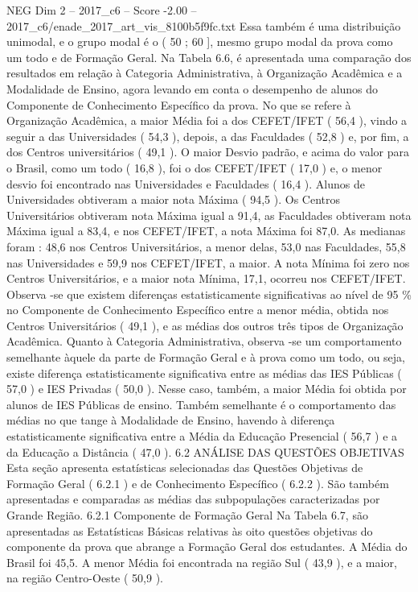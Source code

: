 \begin{textsample}{NEG Dim 2 – 2017\_c6 – Score -2.00 – 2017\_c6/enade\_2017\_art\_vis\_8100b5f9fc.txt}
Essa também é uma distribuição unimodal, e o grupo modal é o ( 50 ; 60 ], mesmo grupo modal da prova como um todo e de Formação Geral.
Na Tabela 6.6, é apresentada uma comparação dos resultados em relação à Categoria Administrativa, à Organização Acadêmica e a Modalidade de Ensino, agora levando em conta o desempenho de alunos do Componente de Conhecimento Específico da prova.
No que se refere à Organização Acadêmica, a maior Média foi a dos CEFET/IFET ( 56,4 ), vindo a seguir a das Universidades ( 54,3 ), depois, a das Faculdades ( 52,8 ) e, por fim, a dos Centros universitários ( 49,1 ).
O maior Desvio padrão, e acima do valor para o Brasil, como um todo ( 16,8 ), foi o dos CEFET/IFET ( 17,0 ) e, o menor desvio foi encontrado nas Universidades e Faculdades ( 16,4 ).
Alunos de Universidades obtiveram a maior nota Máxima ( 94,5 ).
Os Centros Universitários obtiveram nota Máxima igual a 91,4, as Faculdades obtiveram nota Máxima igual a 83,4, e nos CEFET/IFET, a nota Máxima foi 87,0.
As medianas foram : 48,6 nos Centros Universitários, a menor delas, 53,0 nas Faculdades, 55,8 nas Universidades e 59,9 nos CEFET/IFET, a maior.
A nota Mínima foi zero nos Centros Universitários, e a maior nota Mínima, 17,1, ocorreu nos CEFET/IFET.
Observa -se que existem diferenças estatisticamente significativas ao nível de 95 \% no Componente de Conhecimento Específico entre a menor média, obtida nos Centros Universitários ( 49,1 ), e as médias dos outros três tipos de Organização Acadêmica.
Quanto à Categoria Administrativa, observa -se um comportamento semelhante àquele da parte de Formação Geral e à prova como um todo, ou seja, existe diferença estatisticamente significativa entre as médias das IES Públicas ( 57,0 ) e IES Privadas ( 50,0 ).
Nesse caso, também, a maior Média foi obtida por alunos de IES Públicas de ensino.
Também semelhante é o comportamento das médias no que tange à Modalidade de Ensino, havendo à diferença estatisticamente significativa entre a Média da Educação Presencial ( 56,7 ) e a da Educação a Distância ( 47,0 ). 6.2 ANÁLISE DAS QUESTÕES OBJETIVAS Esta seção apresenta estatísticas selecionadas das Questões Objetivas de Formação Geral ( 6.2.1 ) e de Conhecimento Específico ( 6.2.2 ).
São também apresentadas e comparadas as médias das subpopulações caracterizadas por Grande Região. 6.2.1 Componente de Formação Geral Na Tabela 6.7, são apresentadas as Estatísticas Básicas relativas às oito questões objetivas do componente da prova que abrange a Formação Geral dos estudantes.
A Média do Brasil foi 45,5.
A menor Média foi encontrada na região Sul ( 43,9 ), e a maior, na região Centro-Oeste ( 50,9 ).

\end{textsample}
